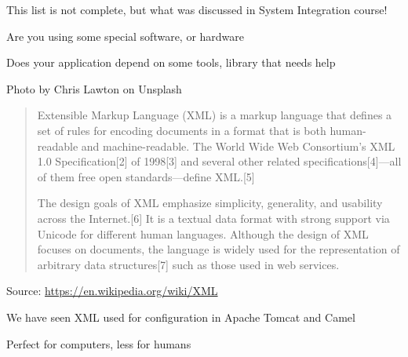 \documentclass[Screen16to9,17pt]{foils}
\begin{document}
\centerline{This list is not complete, but what was discussed in System Integration course!}






\begin{list2}
\item Are you using some special software, or hardware
\item Does your application depend on some tools, library that needs help
\end{list2}







Photo by Chris Lawton on Unsplash


\begin{quote}
  Extensible Markup Language (XML) is a markup language that defines a set of rules for encoding documents in a format that is both human-readable and machine-readable. The World Wide Web Consortium's XML 1.0 Specification[2] of 1998[3] and several other related specifications[4]—all of them free open standards—define XML.[5]

  The design goals of XML emphasize simplicity, generality, and usability across the Internet.[6] It is a textual data format with strong support via Unicode for different human languages. Although the design of XML focuses on documents, the language is widely used for the representation of arbitrary data structures[7] such as those used in web services.
\end{quote}
Source: \url{https://en.wikipedia.org/wiki/XML}

\begin{list2}
\item We have seen XML used for configuration in Apache Tomcat and Camel
\item Perfect for computers, less for humans
\end{list2}

\end{document}
